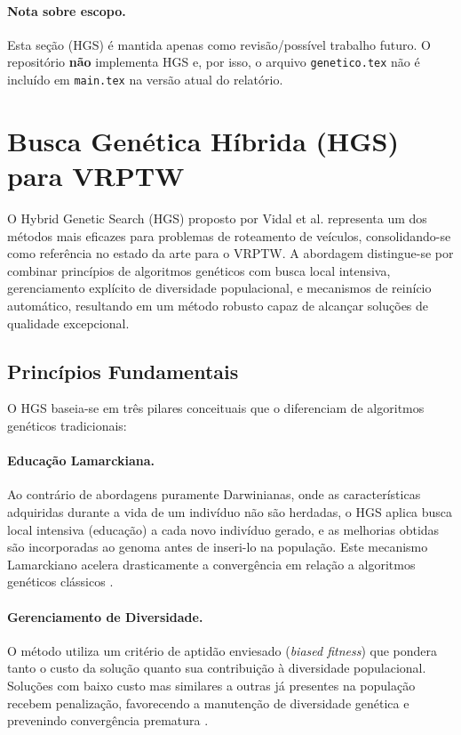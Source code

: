 \paragraph{Nota sobre escopo.} Esta seção (HGS) é mantida apenas como revisão/possível trabalho futuro. O repositório \textbf{não} implementa HGS e, por isso, o arquivo \texttt{genetico.tex} não é incluído em \texttt{main.tex} na versão atual do relatório.

\section{Busca Genética Híbrida (HGS) para VRPTW}
\label{sec:hgs}

O Hybrid Genetic Search (HGS) proposto por Vidal et al. \cite{vidal2012hybrid,vidal2013} representa um dos métodos mais eficazes para problemas de roteamento de veículos, consolidando-se como referência no estado da arte para o VRPTW. A abordagem distingue-se por combinar princípios de algoritmos genéticos com busca local intensiva, gerenciamento explícito de diversidade populacional, e mecanismos de reinício automático, resultando em um método robusto capaz de alcançar soluções de qualidade excepcional.

\subsection{Princípios Fundamentais}

O HGS baseia-se em três pilares conceituais que o diferenciam de algoritmos genéticos tradicionais:

\paragraph{Educação Lamarckiana.} Ao contrário de abordagens puramente Darwinianas, onde as características adquiridas durante a vida de um indivíduo não são herdadas, o HGS aplica busca local intensiva (educação) a cada novo indivíduo gerado, e as melhorias obtidas são incorporadas ao genoma antes de inseri-lo na população. Este mecanismo Lamarckiano acelera drasticamente a convergência em relação a algoritmos genéticos clássicos \cite{vidal2013}.

\paragraph{Gerenciamento de Diversidade.} O método utiliza um critério de aptidão enviesado (\emph{biased fitness}) que pondera tanto o custo da solução quanto sua contribuição à diversidade populacional. Soluções com baixo custo mas similares a outras já presentes na população recebem penalização, favorecendo a manutenção de diversidade genética e prevenindo convergência prematura \cite{vidal2012hybrid}.

